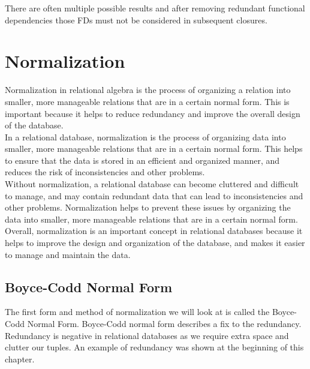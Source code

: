 \documentclass{report}
\begin{document}
        \begin{note}
            There are often multiple possible results and after removing redundant functional dependencies those FDs must not be considered in subsequent closures. 
        \end{note}




\newpage


        \section{Normalization}

        \hspace{.5cm}
        Normalization in relational algebra is the process of organizing a relation into smaller, more manageable relations that are in a certain normal form. This is important because it helps to reduce redundancy and improve the overall design of the database.\\
        \hspace{.5cm}
          In a relational database, normalization is the process of organizing data into smaller, more manageable relations that are in a certain normal form. This helps to ensure that the data is stored in an efficient and organized manner, and reduces the risk of inconsistencies and other problems.\\
        \hspace{.5cm}
          Without normalization, a relational database can become cluttered and difficult to manage, and may contain redundant data that can lead to inconsistencies and other problems. Normalization helps to prevent these issues by organizing the data into smaller, more manageable relations that are in a certain normal form.\\
        \hspace{.5cm} Overall, normalization is an important concept in relational databases because it helps to improve the design and organization of the database, and makes it easier to manage and maintain the data.


        \subsection{Boyce-Codd Normal Form}

        \hspace{.5cm} The first form and method of normalization we will look at is called the Boyce-Codd Normal Form. Boyce-Codd normal form describes a fix to the redundancy. Redundancy is negative in relational databases as we require extra space and clutter our tuples. An example of redundancy was shown at the beginning of this chapter. 
\vspace{.5cm}
 
\end{document}

